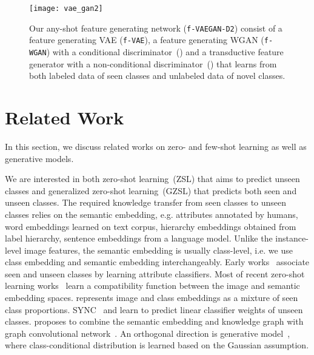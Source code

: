 \documentclass[10pt,twocolumn,letterpaper]{article}
\newcommand{\myparagraph}[1]{\vspace{5pt}\noindent{\bf #1}}
\begin{document}
\begin{figure*}[t]
	\centering
        \texttt{[image: vae\_gan2]}
        \vspace{-5mm}
	\caption{Our any-shot feature generating network (\texttt{f-VAEGAN-D2}) consist of a feature generating VAE (\texttt{f-VAE}), a feature generating WGAN (\texttt{f-WGAN}) with a conditional discriminator~() and a transductive feature generator with a non-conditional discriminator~() that learns from both labeled data of seen classes and unlabeled data of novel classes.}
	\label{fig:model}
\end{figure*}


\section{Related Work}

In this section, we discuss related works on zero- and few-shot learning as well as generative models.

\myparagraph{Zero-shot Learning.} We are interested in both zero-shot learning~(ZSL) that aims to predict unseen classes and generalized zero-shot learning~(GZSL) that predicts both seen and unseen classes. The required knowledge transfer from seen classes to unseen classes relies on the semantic embedding, e.g. attributes annotated by humans, word embeddings learned on text corpus, hierarchy embeddings obtained from label hierarchy, sentence embeddings from a language model. Unlike the instance-level image features, the semantic embedding is usually class-level, i.e. we use class embedding and semantic embedding interchangeably. 
Early works~\cite{LNH13,jayaraman2014zero} associate seen and unseen classes by learning attribute classifiers. 
Most of recent zero-shot learning works~\cite{APHS13,kodirov2017semantic,RT15,FCSBDRM13,zhang2016learning} learn a compatibility function between the image and semantic embedding spaces.  
\cite{ZV15,NMBSSFCD14,CCGS16} represents image and class embeddings as a mixture of seen class proportions. SYNC~\cite{CCGS16} and \cite{ESE13,lei2015predicting} learn to predict linear classifier weights of unseen classes. \cite{Wang_2018_CVPR} proposes to combine the semantic embedding and knowledge graph with graph convolutional network~\cite{kipf2016semi}. An orthogonal direction is generative model~\cite{verma2017simple, mukherjee2016gaussian}, where class-conditional distribution is learned based on the Gaussian assumption.  
\end{document}
